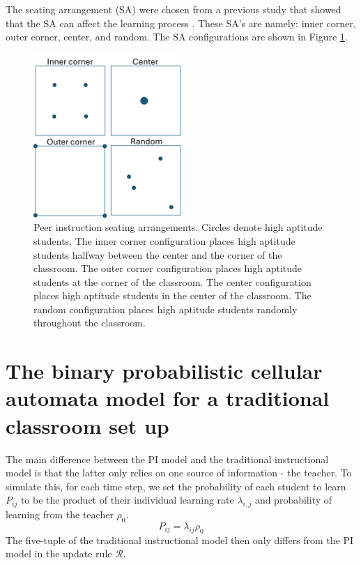 The seating arrangement (SA) were chosen from a previous study that showed that the SA can affect the learning process \cite{roxas2010seating}. These SA's are namely: inner corner, outer corner, center, and random. The SA configurations are shown in Figure \ref{fig:PI SAs}.

 \begin{figure}[h!]
    \centering
    \includegraphics[width=0.5\textwidth]{figures/PI SAs.png}
    \caption[Peer instruction seating arrangements.]{ Peer instruction seating arrangements. Circles denote high aptitude students. The inner corner configuration places high aptitude students halfway between the center and the corner of the classroom. The outer corner configuration places high aptitude students at the corner of the classroom. The center configuration places high aptitude students in the center of the classroom. The random configuration places high aptitude students randomly throughout the classroom.}
    \label{fig:PI SAs}
 \end{figure}

\section{The binary probabilistic cellular automata model for a traditional classroom set up}
The main difference between the PI model and the traditional instructional model is that the latter only relies on one source of information - the teacher. To simulate this, for each time step, we set the probability of each student to learn $P_{ij}$ to be the product of their individual learning rate $\lambda_{i,j}$ and probability of learning from the teacher $\rho_{0}$. 
\begin{equation}
    \label{eq:BPCA traditional learning probability}
        P_{ij} = \lambda_{ij} \rho_{0}
\end{equation}
The five-tuple of the traditional instructional model then only differs from the PI model in the update rule $\mathcal{R}$.

